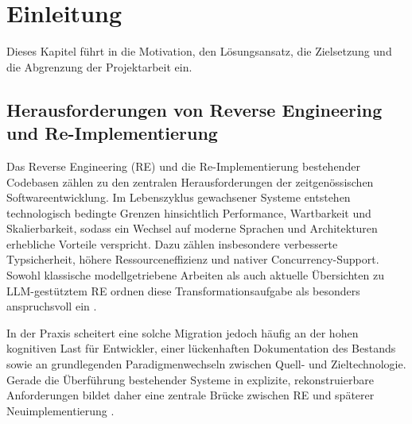 \section{Einleitung} \label{einleitung}

Dieses Kapitel führt in die Motivation, den Lösungsansatz, die Zielsetzung und die Abgrenzung der Projektarbeit ein.

\subsection{Herausforderungen von Reverse Engineering und Re-Implementierung}

Das Reverse Engineering (RE) und die Re-Implementierung bestehender Codebasen zählen zu den zentralen Herausforderungen der zeitgenössischen Softwareentwicklung. Im Lebenszyklus gewachsener Systeme entstehen technologisch bedingte Grenzen hinsichtlich Performance, Wartbarkeit und Skalierbarkeit, sodass ein Wechsel auf moderne Sprachen und Architekturen erhebliche Vorteile verspricht. Dazu zählen insbesondere verbesserte Typsicherheit, höhere Ressourceneffizienz und nativer Concurrency-Support. Sowohl klassische modellgetriebene Arbeiten als auch aktuelle Übersichten zu LLM-gestütztem RE ordnen diese Transformationsaufgabe als besonders anspruchsvoll ein \parencite{raibulet2017mdre,hu2025sokreverseengineering}.

In der Praxis scheitert eine solche Migration jedoch häufig an der hohen kognitiven Last für Entwickler, einer lückenhaften Dokumentation des Bestands sowie an grundlegenden Paradigmenwechseln zwischen Quell- und Zieltechnologie. Gerade die Überführung bestehender Systeme in explizite, rekonstruierbare Anforderungen bildet daher eine zentrale Brücke zwischen RE und späterer Neuimplementierung \parencite{fahmi2007reverse}.


